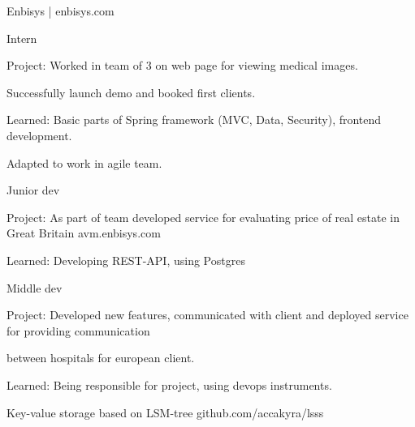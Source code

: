 \documentclass[]{cv-style}
\begin{document}
    {\large{Enbisys | enbisys.com}}
    {\par}
    \vspace{0.2cm}
    {Intern}
    {\par}
    \hspace*{0.7cm} Project: Worked in team of 3 on web page for viewing medical images.
    {\par}
    \hspace*{0.7cm} Successfully launch demo and booked first clients.
    {\par}
    \hspace*{0.7cm} Learned: Basic parts of Spring framework (MVC, Data, Security), frontend development.
    {\par}
    \hspace*{0.7cm} Adapted to work in agile team.
    {\par}
    \vspace{0.1cm}
    {Junior dev}
    {\par}
    \hspace*{0.7cm} Project: As part of team developed service for evaluating price of real estate in Great Britain
    avm.enbisys.com
    {\par}
    \hspace*{0.7cm} Learned: Developing REST-API, using Postgres
    {\par}
    \vspace{0.1cm}
    {Middle dev}
    {\par}
    \hspace*{0.7cm} Project: Developed new features, communicated with client and deployed service for providing communication
    {\par}
    \hspace*{0.7cm} between hospitals for european client.
    {\par}
    \hspace*{0.7cm} Learned: Being responsible for project, using devops instruments.
    {\par}
    \vspace{0.3cm}

    \vspace{1cm}


    \hspace*{0.7cm} {Key-value storage based on LSM-tree github.com/accakyra/lsss}

    \vspace{1cm}
\end{document}
